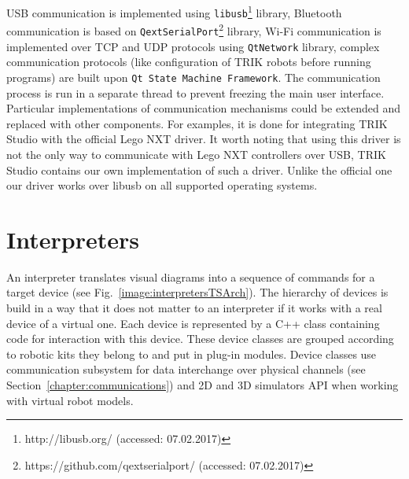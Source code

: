 \documentclass[conference]{IEEEtran}
\begin{document}
USB communication is implemented using \texttt{libusb}\footnote{http://libusb.org/ (accessed: 07.02.2017)} library, Bluetooth communication is based on \texttt{QextSerialPort}\footnote{https://github.com/qextserialport/ (accessed: 07.02.2017)} library, Wi-Fi communication is implemented over TCP and UDP protocols using \texttt{QtNetwork} library, complex communication protocols (like configuration of TRIK robots before running programs) are built upon \texttt{Qt State Machine Framework}. The communication process is run in a separate thread to prevent freezing the main user interface. Particular implementations of communication mechanisms could be extended and replaced with other components. For examples, it is done for integrating TRIK Studio with the official Lego NXT driver. It worth noting that using this driver is not the only way to communicate with Lego NXT controllers over USB, TRIK Studio contains our own implementation of such a driver. Unlike the official one our driver works over libusb on all supported operating systems.

\section{Interpreters}
\label{chapter:interpreters}

An interpreter translates visual diagrams into a sequence of commands for a target device (see Fig.~\ref{image:interpretersTSArch}). The hierarchy of devices is build in a way that it does not matter to an interpreter if it works with a real device of a virtual one. Each device is represented by a C++ class containing code for interaction with this device. These device classes are grouped according to robotic kits they belong to and put in plug-in modules. Device classes use communication subsystem for data interchange over physical channels (see Section~\ref{chapter:communications}) and 2D and 3D simulators API when working with virtual robot models. 
\end{document}
